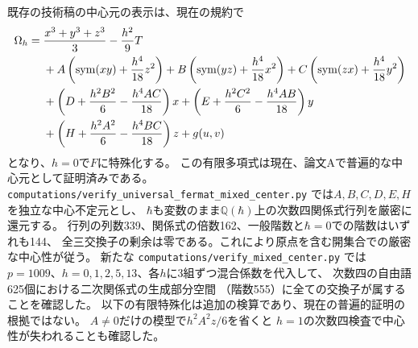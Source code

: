 \begin{remark}[既存原稿の全混合中心元と検算状態]\label{rem:full-mixed-center}
既存の技術稿の中心元の表示は、現在の規約で
\begin{align}\label{eq:full-mixed-center}
\Omega_h={}&\frac{x^3+y^3+z^3}{3}-\frac{h^2}{9}T\notag\\
&+A\left(\operatorname{sym}(xy)+\frac{h^4}{18}z^2\right)
 +B\left(\operatorname{sym}(yz)+\frac{h^4}{18}x^2\right)
 +C\left(\operatorname{sym}(zx)+\frac{h^4}{18}y^2\right)\notag\\
&+\left(D+\frac{h^2B^2}{6}-\frac{h^4AC}{18}\right)x
 +\left(E+\frac{h^2C^2}{6}-\frac{h^4AB}{18}\right)y\notag\\
&+\left(H+\frac{h^2A^2}{6}-\frac{h^4BC}{18}\right)z+g(u,v)
\end{align}
となり、$h=0$で$F$に特殊化する。
この有限多項式は現在、論文Aで普遍的な中心元として証明済みである。
\texttt{computations/verify\_universal\_fermat\_mixed\_center.py}
では$A,B,C,D,E,H$を独立な中心不定元とし、
$\hbar$も変数のまま$\mathbb Q(\hbar)$上の次数四関係式行列を厳密に還元する。
行列の列数339、関係式の倍数162、一般階数と$\hbar=0$での階数はいずれも144、
全三交換子の剰余は零である。これにより原点を含む開集合での厳密な中心性が従う。
新たな \texttt{computations/verify\_mixed\_center.py} では
$p=1009$、$h=0,1,2,5,13$、各$h$に3組ずつ混合係数を代入して、
次数四の自由語625個における二次関係式の生成部分空間
（階数555）に全ての交換子が属することを確認した。
以下の有限特殊化は追加の検算であり、現在の普遍的証明の根拠ではない。
$A\ne0$だけの模型で$h^2A^2z/6$を省くと
$h=1$の次数四検査で中心性が失われることも確認した。
\end{remark}

